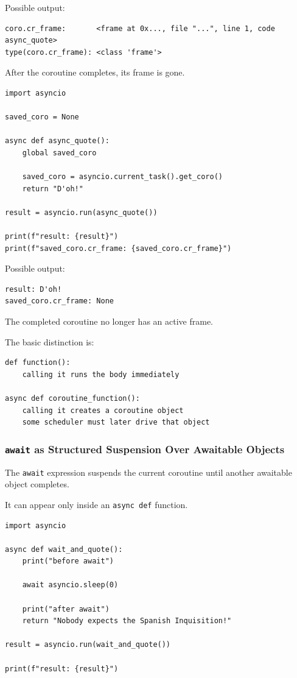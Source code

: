 Possible output:

\begin{verbatim}
coro.cr_frame:       <frame at 0x..., file "...", line 1, code async_quote>
type(coro.cr_frame): <class 'frame'>
\end{verbatim}

After the coroutine completes, its frame is gone.

\begin{verbatim}
import asyncio

saved_coro = None

async def async_quote():
    global saved_coro

    saved_coro = asyncio.current_task().get_coro()
    return "D'oh!"

result = asyncio.run(async_quote())

print(f"result: {result}")
print(f"saved_coro.cr_frame: {saved_coro.cr_frame}")
\end{verbatim}

Possible output:

\begin{verbatim}
result: D'oh!
saved_coro.cr_frame: None
\end{verbatim}

The completed coroutine no longer has an active frame.

The basic distinction is:

\begin{verbatim}
def function():
    calling it runs the body immediately

async def coroutine_function():
    calling it creates a coroutine object
    some scheduler must later drive that object
\end{verbatim}

\subsubsection{\texttt{await} as Structured Suspension Over Awaitable Objects}

The \texttt{await} expression suspends the current coroutine until another awaitable object completes.

It can appear only inside an \texttt{async def} function.

\begin{verbatim}
import asyncio

async def wait_and_quote():
    print("before await")

    await asyncio.sleep(0)

    print("after await")
    return "Nobody expects the Spanish Inquisition!"

result = asyncio.run(wait_and_quote())

print(f"result: {result}")
\end{verbatim}


